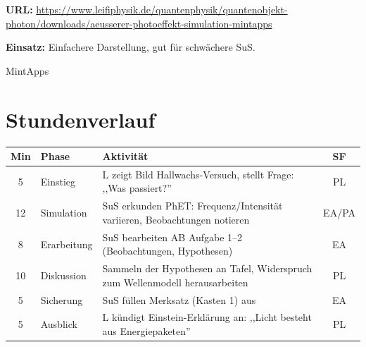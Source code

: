\documentclass[11pt,a4paper]{article}
\begin{document}
\vspace{0.5em}

\begin{tcolorbox}[infobox={Alternative 2: MintApps Photoeffekt}]
\begin{minipage}{0.7\textwidth}
\textbf{URL:} \url{https://www.leifiphysik.de/quantenphysik/quantenobjekt-photon/downloads/aeusserer-photoeffekt-simulation-mintapps}

\textbf{Einsatz:} Einfachere Darstellung, gut für schwächere SuS.
\end{minipage}
\hfill
\begin{minipage}{0.25\textwidth}
\centering
{}

\vspace{0.2cm}
{\scriptsize MintApps}
\end{minipage}
\end{tcolorbox}

\vspace{1em}


\section*{Stundenverlauf}

\begin{tabularx}{\textwidth}{|c|l|X|c|}
\hline
\rowcolor{physiklight}
\textbf{Min} & \textbf{Phase} & \textbf{Aktivität} & \textbf{SF} \\
\hline
5 & Einstieg & L zeigt Bild Hallwachs-Versuch, stellt Frage: ,,Was passiert?'' & PL \\
\hline
12 & Simulation & SuS erkunden PhET: Frequenz/Intensität variieren, Beobachtungen notieren & EA/PA \\
\hline
8 & Erarbeitung & SuS bearbeiten AB Aufgabe 1--2 (Beobachtungen, Hypothesen) & EA \\
\hline
10 & Diskussion & Sammeln der Hypothesen an Tafel, Widerspruch zum Wellenmodell herausarbeiten & PL \\
\hline
5 & Sicherung & SuS füllen Merksatz (Kasten 1) aus & EA \\
\hline
5 & Ausblick & L kündigt Einstein-Erklärung an: ,,Licht besteht aus Energiepaketen'' & PL \\
\hline
\end{tabularx}
\end{document}
